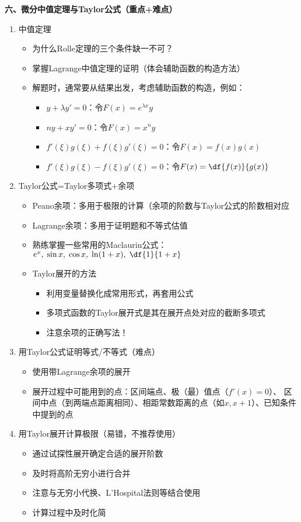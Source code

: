 {\bf 六、微分中值定理与Taylor公式（{重点+难点}）}
\begin{enumerate}
  \item 中值定理
  \begin{itemize}
    \item 为什么Rolle定理的三个条件缺一不可？
    \item 掌握Lagrange中值定理的证明（体会辅助函数的构造方法）
    \item 解题时，通常要从结果出发，考虑辅助函数的构造，例如：
    \begin{itemize}
      \item $y+\lambda y'=0$：令$F(x)=e^{\lambda x}y$
	  \item $ny+xy'=0$：令$F(x)=x^ny$
	  \item $f'(\xi)g(\xi)+f(\xi)g'(\xi)=0$：令$F(x)=f(x)g(x)$
	  \item $f'(\xi)g(\xi)-f(\xi)g'(\xi)=0$：令$F(x)=\df{f(x)}{g(x)}$
    \end{itemize}
  \end{itemize}
  \item Taylor公式=Taylor多项式+余项
  \begin{itemize}
    \item Peano余项：多用于极限的计算（余项的阶数与Taylor公式的阶数相对应
    \item Lagrange余项：多用于证明题和不等式估值
    \item 熟练掌握一些常用的Maclaurin公式：
    $e^x,\;\sin x,\;\cos x,\;\ln(1+x),\;\df{1}{1+x}$
    \item Taylor展开的方法
    \begin{itemize}
      \item 利用变量替换化成常用形式，再套用公式
      \item 多项式函数的Taylor展开式是其在展开点处对应的截断多项式
      \item 注意余项的正确写法！
    \end{itemize}
  \end{itemize}
  \item 用Taylor公式证明等式/不等式（难点）
  \begin{itemize}
    \item 使用带Lagrange余项的展开
	\item 展开过程中可能用到的点：区间端点、极（最）值点（$f'(x)=0$）、
	  区间中点（到两端点距离相同）、相距常数距离的点（如$x,x+1$）、已知条件中提到的点
  \end{itemize}
  \item 用Taylor展开计算极限（易错，不推荐使用）
  \begin{itemize}
      \item 通过试探性展开确定合适的展开阶数
      \item 及时将高阶无穷小进行合并
      \item 注意与无穷小代换、L'Hospital法则等结合使用
      \item 计算过程中及时化简
    \end{itemize}
\end{enumerate}

